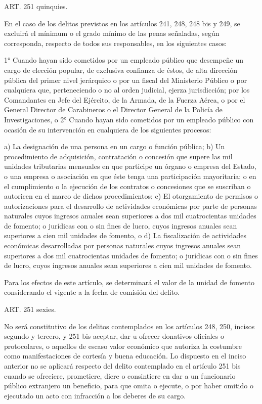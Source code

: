    
    ART. 251 quinquies.

    En el caso de los delitos previstos en los artículos 241, 248, 248 bis y 249, se excluirá el mínimum o el grado mínimo de las penas señaladas, según corresponda, respecto de todos sus responsables, en los siguientes casos:
   
    1° Cuando hayan sido cometidos por un empleado público que desempeñe un cargo de elección popular, de exclusiva confianza de éstos, de alta dirección pública del primer nivel jerárquico o por un fiscal del Ministerio Público o por cualquiera que, perteneciendo o no al orden judicial, ejerza jurisdicción; por los Comandantes en Jefe del Ejército, de la Armada, de la Fuerza Aérea, o por el General Director de Carabineros o el Director General de la Policía de Investigaciones, o
    2° Cuando hayan sido cometidos por un empleado público con ocasión de su intervención en cualquiera de los siguientes procesos:
   
    a) La designación de una persona en un cargo o función pública;
    b) Un procedimiento de adquisición, contratación o concesión que supere las mil unidades tributarias mensuales en que participe un órgano o empresa del Estado, o una empresa o asociación en que éste tenga una participación mayoritaria; o en el cumplimiento o la ejecución de los contratos o concesiones que se suscriban o autoricen en el marco de dichos procedimientos;
    c) El otorgamiento de permisos o autorizaciones para el desarrollo de actividades económicas por parte de personas naturales cuyos ingresos anuales sean superiores a dos mil cuatrocientas unidades de fomento; o jurídicas con o sin fines de lucro, cuyos ingresos anuales sean superiores a cien mil unidades de fomento, o
    d) La fiscalización de actividades económicas desarrolladas por personas naturales cuyos ingresos anuales sean superiores a dos mil cuatrocientas unidades de fomento; o jurídicas con o sin fines de lucro, cuyos ingresos anuales sean superiores a cien mil unidades de fomento.
   
    Para los efectos de este artículo, se determinará el valor de la unidad de fomento considerando el vigente a la fecha de comisión del delito.

   
    ART. 251 sexies.

    No será constitutivo de los delitos contemplados en los artículos 248, 250, incisos segundo y tercero, y 251 bis aceptar, dar u ofrecer donativos oficiales o protocolares, o aquellos de escaso valor económico que autoriza la costumbre como manifestaciones de cortesía y buena educación.
    Lo dispuesto en el inciso anterior no se aplicará respecto del delito contemplado en el artículo 251 bis cuando se ofreciere, prometiere, diere o consintiere en dar a un funcionario público extranjero un beneficio, para que omita o ejecute, o por haber omitido o ejecutado un acto con infracción a los deberes de su cargo.

